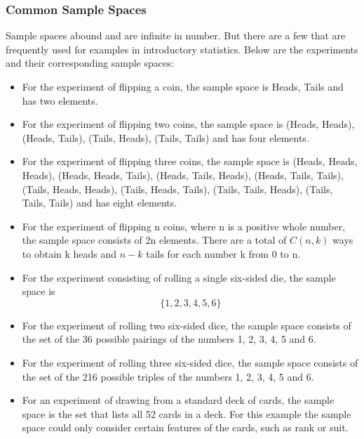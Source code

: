 \documentclass[IntroMain.tex]{subfiles}
\begin{document}
\begin{frame}
	\frametitle{Common Sample Spaces}
	
	Sample spaces abound and are infinite in number. But there are a few that are frequently used for examples in introductory statistics. Below are the experiments and their corresponding sample spaces:
	
	\begin{itemize}
		\item For the experiment of flipping a coin, the sample space is {Heads, Tails} and has two elements.
		
		\item For the experiment of flipping two coins, the sample space is {(Heads, Heads), (Heads, Tails), (Tails, Heads), (Tails, Tails) } and has four elements.
		
		\item For the experiment of flipping three coins, the sample space is {(Heads, Heads, Heads), (Heads, Heads, Tails), (Heads, Tails, Heads), (Heads, Tails, Tails), (Tails, Heads, Heads), (Tails, Heads, Tails), (Tails, Tails, Heads), (Tails, Tails, Tails) } and has eight elements.
		
		\item For the experiment of flipping n coins, where n is a positive whole number, the sample space consists of 2n elements. There are a total of $C(n, k)$ ways to obtain k heads and $n - k$ tails for each number k from 0 to n.
		
		\item For the experiment consisting of rolling a single six-sided die, the sample space is 
		\[\{1, 2, 3, 4, 5, 6\} \]
	\end{itemize}
\end{frame}
\begin{frame}
	\begin{itemize}
		\item For the experiment of rolling two six-sided dice, the sample space consists of the set of the 36 possible pairings of the numbers 1, 2, 3, 4, 5 and 6.
		\item For the experiment of rolling three six-sided dice, the sample space consists of the set of the 216 possible triples of the numbers 1, 2, 3, 4, 5 and 6.
		\item For an experiment of drawing from a standard deck of cards, the sample space is the set that lists all 52 cards in a deck. For this example the sample space could only consider certain features of the cards, such as rank or suit.
	\end{itemize}
\end{frame}
\end{document}
